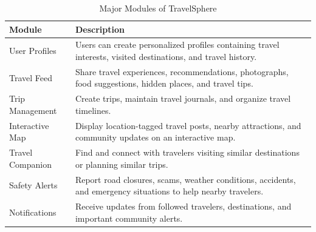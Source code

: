 \documentclass[12pt,a4paper]{article}
\begin{document}
\begin{table}[h]

\centering

\renewcommand{\arraystretch}{1.4}

\begin{tabular}{|p{4cm}|p{10cm}|}

\hline

\textbf{Module} & \textbf{Description} \\

\hline

User Profiles &
Users can create personalized profiles containing travel interests, visited destinations, and travel history. \\

\hline

Travel Feed &
Share travel experiences, recommendations, photographs, food suggestions, hidden places, and travel tips. \\

\hline

Trip Management &
Create trips, maintain travel journals, and organize travel timelines. \\

\hline

Interactive Map &
Display location-tagged travel posts, nearby attractions, and community updates on an interactive map. \\

\hline

Travel Companion &
Find and connect with travelers visiting similar destinations or planning similar trips. \\

\hline

Safety Alerts &
Report road closures, scams, weather conditions, accidents, and emergency situations to help nearby travelers. \\

\hline

Notifications &
Receive updates from followed travelers, destinations, and important community alerts. \\

\hline

\end{tabular}

\caption{Major Modules of TravelSphere}

\end{table}

\end{document}
